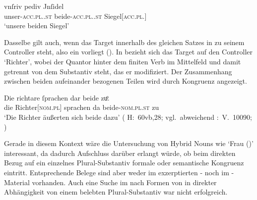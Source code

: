 \begin{exe}
\ex \label{ex:gendassgmt1_txt}
	\gll vnſriv pediv Jnſidel \\
		unser-\textsc{acc.pl.\NeutI.st} beide-\textsc{acc.pl.\NeutI.st}
			Siegel[\textsc{acc.pl.\NeutI}] \\
	\trans `unsere beiden Siegel'
		\parencites(Nr.~3224~A, Freising, 1299)[400,12--13]{cao4}
\end{exe}


Dasselbe gilt auch, wenn das Target innerhalb des gleichen Satzes in
 zu seinem Controller steht, also ein
 vorliegt (). In
 bezieht sich das Target  auf den Controller
 `Richter', wobei der Quantor hinter dem finiten Verb im
Mittelfeld und damit getrennt von dem Substantiv steht, das er modifiziert. Der
Zusammenhang zwischen beiden aufeinander bezogenen Teilen wird durch Kongruenz
angezeigt.

\begin{exe}
\ex \label{ex:gendassgmt2}
	\gll Die richtare ſprachen dar beide zuͦ. \\
		die Richter[\textsc{nom.pl\subM}] sprachen da
		beide-\textsc{nom.pl\subM.st} zu \\
	\trans `Die Richter äußerten sich beide dazu'
		(%
			H:~60vb,28; vgl.~abweichend
			\KC:~V.~10090;
			\cite[267]{schroeder1895}%
		)
\end{exe}

Gerade in diesem Kontext wäre die Untersuchung von Hybrid Nouns wie 
`Frau (\NeutF)' interessant, da dadurch Aufschluss darüber
erlangt würde, ob beim direkten Bezug auf ein einzelnes Plural-Substantiv
formale oder semantische Kongruenz eintritt. Entsprechende Belege sind aber
weder im exzerptierten \CAO{}- noch im \KC{}-Material vorhanden. Auch eine
Suche im \REM{} nach Formen von  in direkter Abhängigkeit von einem
belebten Plural-Substantiv war nicht erfolgreich.

